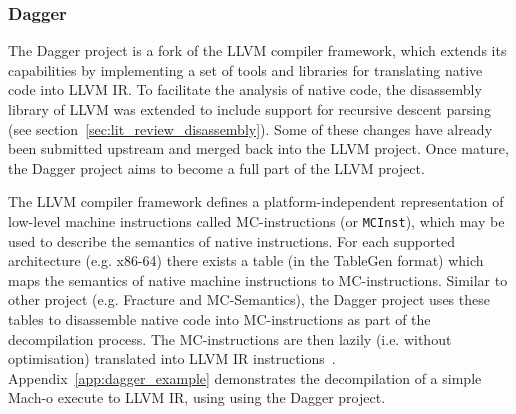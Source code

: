 
\subsubsection{Dagger}
\label{sec:rel_work_dagger}

The Dagger project is a fork of the LLVM compiler framework, which extends its capabilities by implementing a set of tools and libraries for translating native code into LLVM IR. To facilitate the analysis of native code, the disassembly library of LLVM was extended to include support for recursive descent parsing (see section~\ref{sec:lit_review_disassembly}). Some of these changes have already been submitted upstream and merged back into the LLVM project. Once mature, the Dagger project aims to become a full part of the LLVM project.

The LLVM compiler framework defines a platform-independent representation of low-level machine instructions called MC-instructions (or \texttt{MCInst}), which may be used to describe the semantics of native instructions. For each supported architecture (e.g. x86-64) there exists a table (in the TableGen format) which maps the semantics of native machine instructions to MC-instructions. Similar to other project (e.g. Fracture and MC-Semantics), the Dagger project uses these tables to disassemble native code into MC-instructions as part of the decompilation process. The MC-instructions are then lazily (i.e. without optimisation) translated into LLVM IR instructions~\cite{dagger}. Appendix~\ref{app:dagger_example} demonstrates the decompilation of a simple Mach-o execute to LLVM IR, using using the Dagger project.
